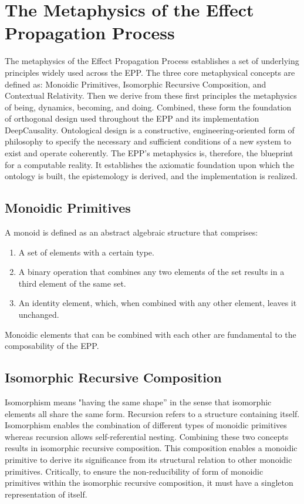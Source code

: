 \section{The Metaphysics of the Effect Propagation Process}
\label{sec:metaphysics}

The metaphysics of the Effect Propagation Process establishes a set of underlying principles widely used across the EPP. The three core metaphysical concepts are defined as: Monoidic Primitives, Isomorphic Recursive Composition, and Contextual Relativity. Then we derive from these first principles the metaphysics of being, dynamics, becoming, and doing. Combined, these form the foundation of orthogonal design used throughout the EPP and its implementation DeepCausality. Ontological design is a constructive, engineering-oriented form of philosophy to specify the necessary and sufficient conditions of a new system to exist and operate coherently. The EPP's metaphysics is, therefore, the blueprint for a computable reality. It establishes the axiomatic foundation upon which the ontology is built, the epistemology is derived, and the implementation is realized.

\subsection{Monoidic Primitives} 
\label{sec:metaphysics_monoidic_primitives}

A monoid is defined as an abstract algebraic structure that comprises:

\begin{enumerate}
	\item A set of elements with a certain type.
	\item A binary operation that combines any two elements of the set results in a third element of the same set.
	\item An identity element, which, when combined with any other element, leaves it unchanged.
\end{enumerate}

  Monoidic elements that can be combined with each other are fundamental to the composability of the EPP.
  
\subsection{Isomorphic Recursive Composition} 
\label{sec:metaphysics_isomorphic_recursive_composition}


Isomorphism means "having the same shape” in the sense that isomorphic elements all share the same form. Recursion refers to a structure containing itself. Isomorphism enables the combination of different types of monoidic primitives whereas recursion allows self-referential nesting. Combining these two concepts results in isomorphic recursive composition. This composition enables a monoidic primitive to derive its significance from its structural relation to other monoidic primitives. Critically, to ensure the non-reducibility of form of monoidic primitives within the isomorphic recursive composition, it must have a singleton representation of itself. 

